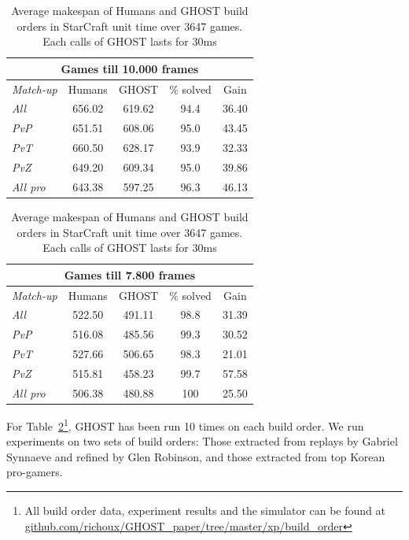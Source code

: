 \documentclass[journal]{IEEEtran}
\newcommand{\ghost}{\textsc{GHOST}\xspace}
\begin{document}
\begin{table}[ht]
  \caption{Average  makespan  of Humans  and  \ghost  build orders  in
    StarCraft unit time over 3647 games. Each calls  of \ghost
    lasts for 30ms}
  \label{tab:bo}
  \centering
  \begin{tabular}{|l|c|c|c|c|} 
    \hline
    \multicolumn{5}{|c|}{Games till 10.000 frames} \\ 
    \hline
    {\em Match-up} & Humans & \ghost & \% solved &
    Gain \\ 
    \hline
    {\em All} & 656.02 & 619.62 & 94.4 & 36.40\\
    {\em PvP} & 651.51 & 608.06 & 95.0 & 43.45\\
    {\em PvT} & 660.50 & 628.17 & 93.9 & 32.33\\
    {\em PvZ} & 649.20 & 609.34 & 95.0 & 39.86\\
    \hline
    \hline
    {\em All pro} & 643.38 & 597.25 & 96.3 & 46.13\\
    \hline
  \end{tabular}
  \begin{tabular}{|l|c|c|c|c|} 
    \hline
    \multicolumn{5}{|c|}{Games till 7.800 frames} \\ 
    \hline
    {\em Match-up} & Humans & \ghost & \% solved &
    Gain \\ 
    \hline
    {\em All} & 522.50 & 491.11 & 98.8 & 31.39\\
    {\em PvP} & 516.08 & 485.56 & 99.3 & 30.52\\
    {\em PvT} & 527.66 & 506.65 & 98.3 & 21.01\\
    {\em PvZ} & 515.81 & 458.23 & 99.7 & 57.58\\ 
    \hline
    \hline
    {\em All pro} & 506.38 & 480.88 & 100 & 25.50\\
    \hline
  \end{tabular}  
\end{table}

For  Table~\ref{tab:bo}\footnote{All  build   order  data,  experiment
  results     and     the     simulator    can     be     found     at
  \href{https://github.com/richoux/GHOST\_paper/tree/master/xp/build\_order}{github.com/richoux/GHOST\_paper/tree/master/xp/build\_order}},
\ghost has been  run 10 times on each build  order. We run experiments
on two sets  of build orders: Those extracted from  replays by Gabriel
Synnaeve and  refined by Glen  Robinson, and those extracted  from top
Korean pro-gamers.
\end{document}
